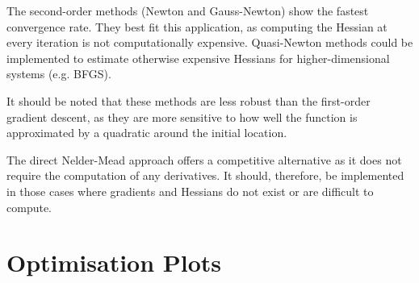 \documentclass[hidelinks]{article}
\begin{document}
The second-order methods (Newton and Gauss-Newton) show the fastest convergence rate. They best fit this application, as computing the Hessian at every iteration is not computationally expensive. Quasi-Newton methods could be implemented to estimate otherwise expensive Hessians for higher-dimensional systems (e.g. BFGS).
\par It should be noted that these methods are less robust than the first-order gradient descent, as they are more sensitive to how well the function is approximated by a quadratic around the initial location.
\par The direct Nelder-Mead approach offers a competitive alternative as it does not require the computation of any derivatives. It should, therefore, be implemented in those cases where gradients and Hessians do not exist or are difficult to compute.
%
\appendix{} 
\section{Optimisation Plots} \label{appendix:A}
%
\end{document}
